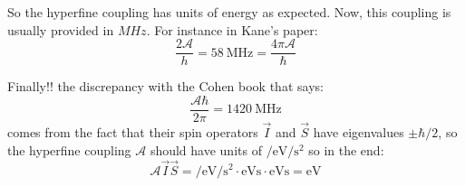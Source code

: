 So the hyperfine coupling has units of energy as expected. Now, this coupling is usually provided in $MHz$. For instance in Kane's paper:
\begin{equation}
  \frac{2\mathcal{A}}{h} = \SI{58}{\MHz} = \frac{4\pi\mathcal{A}}{\hbar}
\end{equation}

Finally!! the discrepancy with the Cohen book that says:
\begin{equation}
  \frac{\mathcal{A}\hbar}{2\pi} = \SI{1420}{\MHz}
\end{equation}
comes from the fact that their spin operators $\vec{I}$ and $\vec{S}$ have eigenvalues $\pm\hbar/2$, so the hyperfine coupling $\mathcal{A}$ should have units of $\si{\per\eV\per\s\squared}$ so in the end:
\begin{equation}
  \mathcal{A}\vec{I}\vec{S} = \si{\per\eV\per\s\squared}\cdot\si{\eV\s}\cdot \si{\eV\s} = \si{\eV}
\end{equation}
